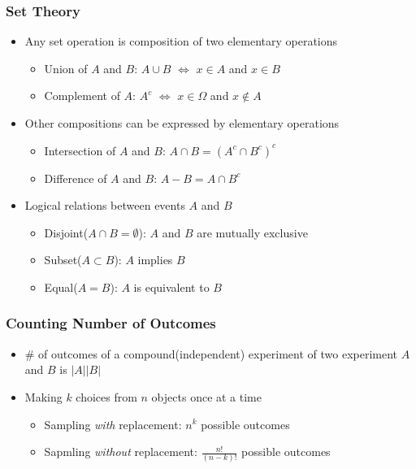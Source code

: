 \subsubsection*{Set Theory}
\begin{itemize}
    \item Any set operation is composition of two elementary operations
    \begin{itemize}
        \item Union of $A$ and $B$: $A\cup B$ $\iff$ $x\in A$ and $x\in B$
        \item Complement of $A$: $A^c$ $\iff$ $x\in\Omega$ and $x\notin A$
    \end{itemize}
    \item Other compositions can be expressed by elementary operations
    \begin{itemize}
        \item Intersection of $A$ and $B$: $A\cap B=(A^c\cap B^c)^c$
        \item Difference of $A$ and $B$: $A-B=A\cap B^c$
    \end{itemize}
    \item Logical relations between events $A$ and $B$
    \begin{itemize}
        \item Disjoint($A\cap B=\emptyset$): $A$ and $B$ are mutually exclusive
        \item Subset($A\subset B$): $A$ implies $B$
        \item Equal($A=B$): $A$ is equivalent to $B$
    \end{itemize}
\end{itemize}

\subsubsection*{Counting Number of Outcomes}
\begin{itemize}
    \item \# of outcomes of a compound(independent) experiment of two experiment $A$ and $B$ is $|A||B|$
    \item Making $k$ choices from $n$ objects once at a time
    \begin{itemize}
        \item Sampling \textit{with} replacement: $n^k$ possible outcomes
        \item Sapmling \textit{without} replacement: $\frac{n!}{(n-k)!}$ possible outcomes
    \end{itemize}
\end{itemize}
\clearpage

